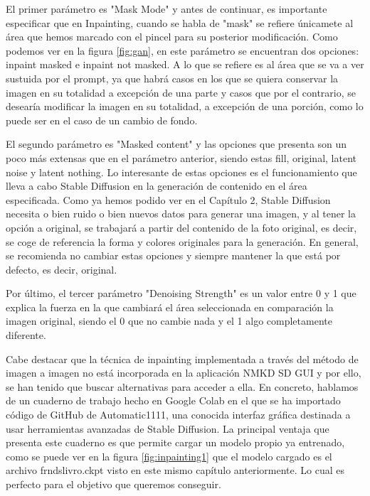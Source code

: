 El primer parámetro es "Mask Mode" y antes de continuar, es importante especificar que en Inpainting, cuando se habla de "mask" se refiere únicamete al área que hemos marcado con el pincel para su posterior modificación. Como podemos ver en la figura \ref{fig:gan}, en este parámetro se encuentran dos opciones: inpaint masked e inpaint not masked. A lo que se refiere es al área que se va a ver sustuida por el prompt, ya que habrá casos en los que se quiera conservar la imagen en su totalidad a excepción de una parte y casos que por el contrario, se desearía modificar la imagen en su totalidad, a excepción de una porción, como lo puede ser en el caso de un cambio de fondo. 

El segundo parámetro es "Masked content" y las opciones que presenta son un poco más extensas que en el parámetro anterior, siendo estas fill, original, latent noise y latent nothing. Lo interesante de estas opciones es el funcionamiento que lleva a cabo Stable Diffusion en la generación de contenido en el área especificada. Como ya hemos podido ver en el Capítulo 2, Stable Diffusion necesita o bien ruido o bien nuevos datos para generar una imagen, y al tener la opción a original, se trabajará a partir del contenido de la foto original, es decir, se coge de referencia la forma y colores originales para la generación. En general, se recomienda no cambiar estas opciones y siempre mantener la que está por defecto, es decir, original. 

Por último, el tercer parámetro "Denoising Strength" es un valor entre 0 y 1 que explica la fuerza en la que cambiará el área seleccionada en comparación la imagen original, siendo el 0 que no cambie nada y el 1 algo completamente diferente. 

Cabe destacar que la técnica de inpainting implementada a través del método de imagen a imagen no está incorporada en la aplicación NMKD SD GUI y por ello, se han tenido que buscar alternativas para acceder a ella. En concreto, hablamos de un cuaderno de trabajo hecho en Google Colab en el que se ha importado código de GitHub de Automatic1111, una conocida interfaz gráfica destinada a usar herramientas avanzadas de Stable Diffusion. La principal ventaja que presenta este cuaderno es que permite cargar un modelo propio ya entrenado, como se puede ver en la figura \ref{fig:inpainting1} que el modelo cargado es el archivo frndslivro.ckpt visto en este mismo capítulo anteriormente. Lo cual es perfecto para el objetivo que queremos conseguir. 

